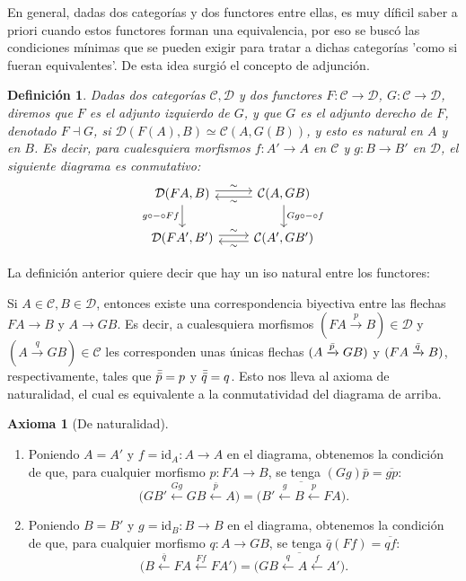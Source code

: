 \documentclass[12pt,letterpaper,titlepage]{article}
\newtheorem*{defn}{Definición}
\theoremstyle{definition}
\newtheorem*{axiom}{Axioma}
\newcommand\ol[1]{\overline{#1}}
\renewcommand\cal[1]{\mathcal{#1}}
\newcommand\rar[1]{\xrightarrow{#1}}
\newcommand\lar[1]{\xleftarrow{#1}}
\newcommand\<{\langle}
\renewcommand\>{\rangle}
\newcommand{\id}{\mathrm{id}}
\begin{document}
En general, dadas dos categorías y dos functores entre ellas, es muy díficil saber a priori cuando estos functores forman una equivalencia, por eso se buscó las condiciones mínimas que se pueden exigir para tratar a dichas categorías 'como si fueran equivalentes'. De esta idea surgió el concepto de adjunción.
\begin{defn}
    Dadas dos categorías $\mathcal{C,D}$ y dos functores $F:\mathcal{C\to D}$, $G:\mathcal{C\to D}$, diremos que $F$ es el adjunto izquierdo de $G$, y que $G$ es el adjunto derecho de $F$, denotado $F\dashv G$, si $\mathcal{D}(F(A),B)\simeq \mathcal{C}(A,G(B))$, y esto es natural en $A$ y en $B$.
    Es decir, para cualesquiera morfismos $f:A'\to A$
    en $\cal C$ y $g:B\to B'$ en $\cal D$,
    el siguiente diagrama es conmutativo:
    \[
        \begin{tikzcd}
            \cal D(FA,B)
                \ar[d,"g\circ-\circ Ff"']
                \ar[r,"\sim",shift left]
            & \cal C(A,GB) 
                \ar[d,"Gg\circ-\circ f"]
                \ar[l,"\sim",shift left] \\
            \cal D(FA',B')
                \ar[r,"\sim",shift left]
            & \cal C(A',GB')
                \ar[l,"\sim",shift left]
        \end{tikzcd}
    \]
\end{defn}
La definición anterior quiere decir que hay un iso natural entre los functores:

Si $A\in\mathcal{C}, B\in\mathcal{D}$,
entonces existe una correspondencia biyectiva entre las flechas
$FA\to B$ y $A\to GB$.
Es decir, a cualesquiera morfismos
$(FA\rar p B)\in\cal{D}$
y $(A\rar q GB)\in\mathcal{C}$
les corresponden unas únicas flechas
$(A\rar{\Bar{p}}GB)$
y $(FA\rar{\Bar{q}}B)$,
respectivamente,
tales que $\Bar{\Bar{p}}=p$ y $\Bar{\Bar{q}}=q$.
Esto nos lleva al axioma de naturalidad,
el cual es equivalente a la conmutatividad
del diagrama de arriba.

\begin{axiom}[De naturalidad]
    \leavevmode
    \begin{enumerate}
        \item
        Poniendo $A=A'$ y $f=\id_A:A\to A$ en el diagrama,
        obtenemos la condición de que,
        para cualquier morfismo $p:FA\to B$,
        se tenga $(Gg)\bar p=\ol{gp}$:
        \[
            \Big(GB' \lar{Gg} GB \lar{\bar p} A\Big)
            =
            \ol{\Big(B' \lar g B \lar p FA \Big)}
        .\]
        \item
        Poniendo $B=B'$ y $g=\id_B:B\to B$ en el diagrama,
        obtenemos la condición de que,
        para cualquier morfismo $q:A\to GB$,
        se tenga $\bar q(Ff)=\ol{qf}$:
        \[
            \Big(B\lar{\bar q} FA\lar{Ff}FA'\Big)
            =
            \ol{\Big(GB\lar q A\lar f A'\Big)}
        .\]
    \end{enumerate}
\end{axiom}
\end{document}
